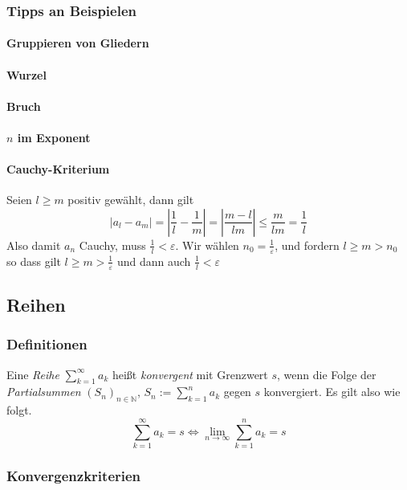 \documentclass[a4paper, 9pt, DIV=24]{scrartcl}
\newcommand{\N}{\mathbb{N}}
\begin{document}
\subsubsection{Tipps an Beispielen}
\paragraph{Gruppieren von Gliedern}

\paragraph{Wurzel}

\paragraph{Bruch}

\paragraph{$n$ im Exponent}

\paragraph{Cauchy-Kriterium}
Seien $l\geq m$ positiv gewählt, dann gilt 
\[ | a_l - a_m | = \left|\frac{1}{l} - \frac{1}{m}\right| = \left|\frac{m-l}{lm}\right| \leq \frac{m}{lm} = \frac{1}{l} \]
Also damit $a_n$ Cauchy, muss $\tfrac{1}{l}<\varepsilon$. Wir wählen $n_0 = \tfrac{1}{\varepsilon}$, und fordern $l \geq m > n_0$ so dass gilt $l \geq m > \tfrac{1}{\varepsilon}$ und dann auch $\tfrac{1}{l} < \varepsilon$

\subsection{Reihen}
\subsubsection{Definitionen}
Eine \emph{Reihe} $\sum_{k = 1}^\infty a_k$ heißt \emph{konvergent} mit Grenzwert $s$, wenn die Folge der \emph{Partialsummen}
$(S_n)_{n \in \N}$, $S_n := \sum_{k=1}^n a_k$ gegen $s$ konvergiert. Es gilt also wie folgt.
\[ \sum_{k=1}^\infty a_k = s \iff \lim_{n\to\infty} \sum_{k=1}^n a_k = s \]

\subsubsection{Konvergenzkriterien}
\end{document}
